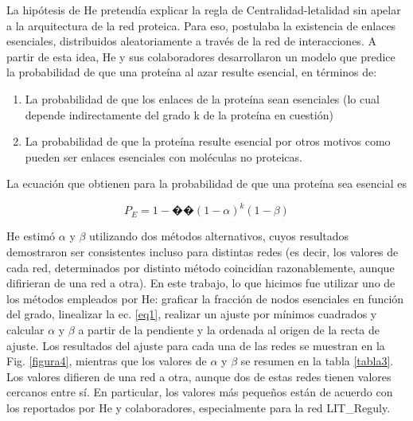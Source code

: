 \documentclass[%
 reprint,
 amsmath,amssymb,
 aps,
]{revtex4-1}
\begin{document}
La hip\'otesis de He pretend\'ia explicar la regla de Centralidad-letalidad sin apelar a la arquitectura de la red proteica. Para eso, postulaba la existencia de enlaces esenciales, distribuidos aleatoriamente a trav\'es de la red de interacciones. A partir de esta idea, He y sus colaboradores desarrollaron un modelo que predice la probabilidad de que una prote\'ina al azar resulte esencial, en t\'erminos de:

\begin{enumerate}
\item La probabilidad de que los enlaces de la prote\'ina sean esenciales (lo cual depende indirectamente del grado k de la prote\'ina en cuesti\'on)
\item La probabilidad de que la prote\'ina resulte esencial por otros motivos como pueden ser enlaces esenciales con mol\'eculas no proteicas. 
\end{enumerate}

La ecuaci\'on que obtienen para la probabilidad de que una prote\'ina sea esencial es

\begin{equation}
P_E = 1 -�� (1-\alpha)^k(1-\beta)
\label{eq1}
\end{equation}

He estim\'o $\alpha$ y $\beta$ utilizando dos m\'etodos alternativos, cuyos resultados demostraron ser consistentes incluso para distintas redes (es decir, los valores de cada red, determinados por distinto m\'etodo coincid\'ian razonablemente, aunque difirieran de una red a otra). En este trabajo, lo que hicimos fue utilizar uno de los m\'etodos empleados por He: graficar la fracci\'on de nodos esenciales en funci\'on del grado, linealizar la ec. \ref{eq1}, realizar un ajuste por m\'inimos cuadrados y calcular $\alpha$ y $\beta$ a partir de la pendiente y la ordenada al origen de la recta de ajuste. Los resultados del ajuste para cada una de las redes se muestran en la Fig. \ref{figura4}, mientras que los valores de $\alpha$ y $\beta$ se resumen en la tabla \ref{tabla3}. Los valores difieren de una red a otra, aunque dos de estas redes tienen valores cercanos entre s\'i. En particular, los valores m\'as peque\~nos est\'an de acuerdo con los reportados por He y colaboradores, especialmente para la red LIT\_Reguly. 
\end{document}
